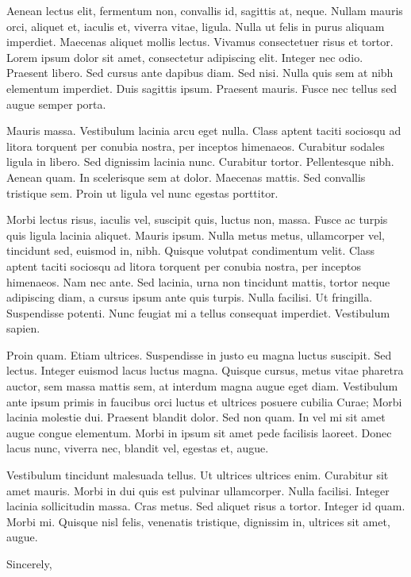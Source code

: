 \documentclass[10pt]{deptletter}
\begin{document}
Aenean lectus elit, fermentum non, convallis id, sagittis at, neque. Nullam
mauris orci, aliquet et, iaculis et, viverra vitae, ligula. Nulla ut felis
in purus aliquam imperdiet. Maecenas aliquet mollis lectus. Vivamus
consectetuer risus et tortor. Lorem ipsum dolor sit amet, consectetur
adipiscing elit. Integer nec odio. Praesent libero. Sed cursus ante dapibus
diam. Sed nisi. Nulla quis sem at nibh elementum imperdiet. Duis sagittis
ipsum. Praesent mauris. Fusce nec tellus sed augue semper porta. 

Mauris massa. Vestibulum lacinia arcu eget nulla. Class aptent taciti
sociosqu ad litora torquent per conubia nostra, per inceptos himenaeos.
Curabitur sodales ligula in libero. Sed dignissim lacinia nunc. Curabitur
tortor. Pellentesque nibh. Aenean quam. In scelerisque sem at dolor.
Maecenas mattis. Sed convallis tristique sem. Proin ut ligula vel nunc
egestas porttitor. 

Morbi lectus risus, iaculis vel, suscipit quis, luctus non, massa. Fusce ac
turpis quis ligula lacinia aliquet. Mauris ipsum. Nulla metus metus,
ullamcorper vel, tincidunt sed, euismod in, nibh. Quisque volutpat
condimentum velit. Class aptent taciti sociosqu ad litora torquent per
conubia nostra, per inceptos himenaeos. Nam nec ante. Sed lacinia, urna non
tincidunt mattis, tortor neque adipiscing diam, a cursus ipsum ante quis
turpis. Nulla facilisi. Ut fringilla. Suspendisse potenti. Nunc feugiat mi
a tellus consequat imperdiet. Vestibulum sapien. 

Proin quam. Etiam ultrices. Suspendisse in justo eu magna luctus suscipit.
Sed lectus. Integer euismod lacus luctus magna. Quisque cursus, metus vitae
pharetra auctor, sem massa mattis sem, at interdum magna augue eget diam.
Vestibulum ante ipsum primis in faucibus orci luctus et ultrices posuere
cubilia Curae; Morbi lacinia molestie dui. Praesent blandit dolor. Sed non
quam. In vel mi sit amet augue congue elementum. Morbi in ipsum sit amet
pede facilisis laoreet. Donec lacus nunc, viverra nec, blandit vel, egestas
et, augue. 

Vestibulum tincidunt malesuada tellus. Ut ultrices ultrices enim. Curabitur
sit amet mauris. Morbi in dui quis est pulvinar ullamcorper. Nulla
facilisi. Integer lacinia sollicitudin massa. Cras metus. Sed aliquet risus
a tortor. Integer id quam. Morbi mi. Quisque nisl felis, venenatis
tristique, dignissim in, ultrices sit amet, augue. 

\closing{Sincerely,}

\end{document}
